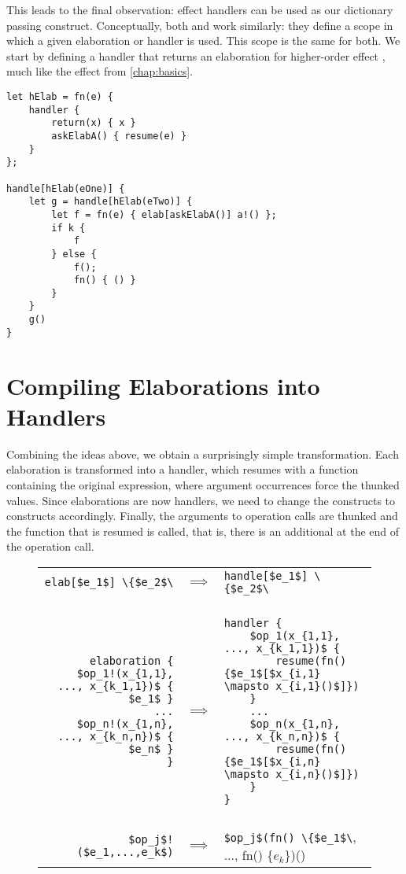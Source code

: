 This leads to the final observation: effect handlers can be used as our dictionary passing construct. Conceptually, both  and  work similarly: they define a scope in which a given elaboration or handler is used. This scope is the same for both. We start by defining a handler that returns an elaboration for higher-order effect , much like the  effect from \cref{chap:basics}.

\begin{lstlisting}[language=elaine,style=fancy]
let hElab = fn(e) {
    handler {
        return(x) { x }
        askElabA() { resume(e) }
    }
};

handle[hElab(eOne)] {
    let g = handle[hElab(eTwo)] {
        let f = fn(e) { elab[askElabA()] a!() };
        if k {
            f
        } else {
            f();
            fn() { () }
        }
    }
    g()
}
\end{lstlisting}

\section{Compiling Elaborations into Handlers}

Combining the ideas above, we obtain a surprisingly simple transformation. Each elaboration is transformed into a handler, which resumes with a function containing the original expression, where argument occurrences force the thunked values. Since elaborations are now handlers, we need to change the  constructs to  constructs accordingly. Finally, the arguments to operation calls are thunked and the function that is resumed is called, that is, there is an additional \el{()} at the end of the operation call.

\begin{figure}[h]
\begin{tabular}{rcl}
\lstinline{elab[$e_1$] \{$e_2$\}}
& $\implies$
& \lstinline{handle[$e_1$] \{$e_2$\}}
\\\\
\begin{lstlisting}
elaboration {
    $op_1!(x_{1,1}, ..., x_{k_1,1})$ { $e_1$ }
    ...
    $op_n!(x_{1,n}, ..., x_{k_n,n})$ { $e_n$ }
}
\end{lstlisting}
&$\implies$
&\begin{lstlisting}
handler {
    $op_1(x_{1,1}, ..., x_{k_1,1})$ {
        resume(fn() {$e_1$[$x_{i,1} \mapsto x_{i,1}()$]})
    }
    ...
    $op_n(x_{1,n}, ..., x_{k_n,n})$ {
        resume(fn() {$e_1$[$x_{i,n} \mapsto x_{i,n}()$]})
    }
}
\end{lstlisting}
\\\\
\lstinline|$op_j$!($e_1,...,e_k$)|
& $\implies$
& \lstinline{$op_j$(fn() \{$e_1$\}, ..., fn() \{$e_k$\})()}
\end{tabular}
\end{figure}

